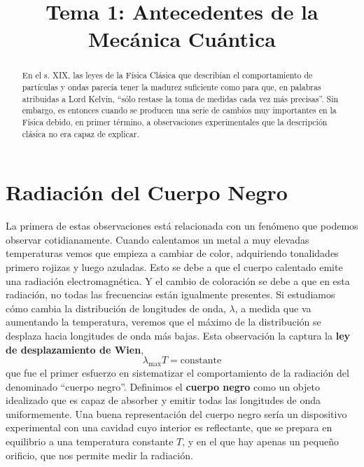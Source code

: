 \documentclass{tufte-handout}
\title[Química Física II: Tema 1, Antecedentes]{
Tema 1: Antecedentes de la Mecánica Cuántica}
\date{}  %
\begin{document}
\maketitle%

\begin{abstract}
\noindent En el s. XIX, las leyes de la Física Clásica que describían 
el comportamiento de partículas y ondas parecía tener la madurez
suficiente como para que, en palabras atribuidas a Lord Kelvin,
``sólo restase la toma de medidas cada vez más 
precisas''. Sin embargo, 
es entonces cuando se producen una serie de cambios muy 
importantes  en la Física debido, en primer término, a
observaciones experimentales que la descripción 
clásica  no era capaz de explicar.
\end{abstract}


\section{Radiación del Cuerpo Negro}
La primera de estas observaciones está relacionada con un
fenómeno que podemos observar cotidianamente. Cuando calentamos un metal 
a muy elevadas temperaturas vemos que empieza a cambiar de 
color, adquiriendo tonalidades primero rojizas y luego azuladas.
Esto se debe a que  el cuerpo calentado emite una radiación
electromagnética. Y el cambio de coloración se debe a que 
en esta radiación, no todas las frecuencias 
están igualmente presentes. Si estudiamos cómo cambia la 
distribución de longitudes de onda, $\lambda$,  a medida que va 
aumentando la temperatura, veremos que el máximo de la distribución
se desplaza hacia longitudes de onda más bajas. Esta observación la
captura la \textbf{ley de desplazamiento de Wien},
\begin{equation}
\lambda_\mathrm{max}T=\mathrm{constante}
\label{eq:Wien}
\end{equation}
que fue el primer esfuerzo en sistematizar el comportamiento
de la radiación del denominado ``cuerpo negro''.
Definimos el \textbf{cuerpo negro} como un objeto 
idealizado que es capaz de absorber y emitir 
todas las longitudes de onda uniformemente. 
Una buena
representación del cuerpo negro sería un dispositivo experimental 
con una cavidad cuyo interior es reflectante, que se prepara en
equilibrio a una temperatura constante $T$, y en el que hay apenas 
un pequeño orificio, que nos permite medir la radiación. 
\end{document}
